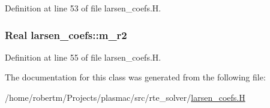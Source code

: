 Definition at line 53 of file larsen\+\_\+coefs.\+H.

\subsubsection[{\texorpdfstring{m\+\_\+r2}{m_r2}}]{\setlength{\rightskip}{0pt plus 5cm}Real larsen\+\_\+coefs\+::m\+\_\+r2\hspace{0.3cm}{\ttfamily [protected]}}\hypertarget{classlarsen__coefs_af298f1540fa42112562e7005ac8c7553}{}\label{classlarsen__coefs_af298f1540fa42112562e7005ac8c7553}


Definition at line 55 of file larsen\+\_\+coefs.\+H.



The documentation for this class was generated from the following file\+:\begin{DoxyCompactItemize}
\item 
/home/robertm/\+Projects/plasmac/src/rte\+\_\+solver/\hyperlink{larsen__coefs_8H}{larsen\+\_\+coefs.\+H}\end{DoxyCompactItemize}
